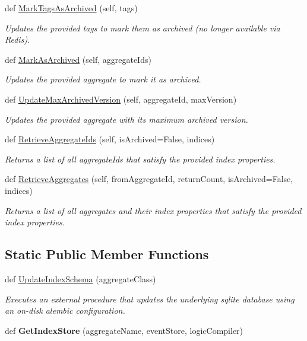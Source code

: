 \begin{DoxyCompactItemize}
\item 
def \hyperlink{group__Chronos_gae214bee43e5148b5190c7ba0f6aa63ef}{Mark\+Tags\+As\+Archived} (self, tags)
\begin{DoxyCompactList}\small\item\em Updates the provided tags to mark them as archived (no longer available via Redis). \end{DoxyCompactList}\item 
def \hyperlink{group__Chronos_ga04d2c0aa20ac6cfe356b724e8c62dd8b}{Mark\+As\+Archived} (self, aggregate\+Ids)
\begin{DoxyCompactList}\small\item\em Updates the provided aggregate to mark it as archived. \end{DoxyCompactList}\item 
def \hyperlink{group__Chronos_gae824d1e632ce32a311c6a07756f17c28}{Update\+Max\+Archived\+Version} (self, aggregate\+Id, max\+Version)
\begin{DoxyCompactList}\small\item\em Updates the provided aggregate with its maximum archived version. \end{DoxyCompactList}\item 
def \hyperlink{group__Chronos_ga960e19d8f65569f80fd580eebd605031}{Retrieve\+Aggregate\+Ids} (self, is\+Archived=False, indices)
\begin{DoxyCompactList}\small\item\em Returns a list of all aggregate\+Ids that satisfy the provided index properties. \end{DoxyCompactList}\item 
def \hyperlink{group__Chronos_ga3e51459a6d624a6abf12d983139e6acd}{Retrieve\+Aggregates} (self, from\+Aggregate\+Id, return\+Count, is\+Archived=False, indices)
\begin{DoxyCompactList}\small\item\em Returns a list of all aggregates and their index properties that satisfy the provided index properties. \end{DoxyCompactList}\end{DoxyCompactItemize}
\subsection*{Static Public Member Functions}
\begin{DoxyCompactItemize}
\item 
def \hyperlink{group__Chronos_ga03ff3b6b6e521bc886259e7b8f390819}{Update\+Index\+Schema} (aggregate\+Class)
\begin{DoxyCompactList}\small\item\em Executes an external procedure that updates the underlying sqlite database using an on-\/disk alembic configuration. \end{DoxyCompactList}\item 
def {\bfseries Get\+Index\+Store} (aggregate\+Name, event\+Store, logic\+Compiler)
\end{DoxyCompactItemize}
